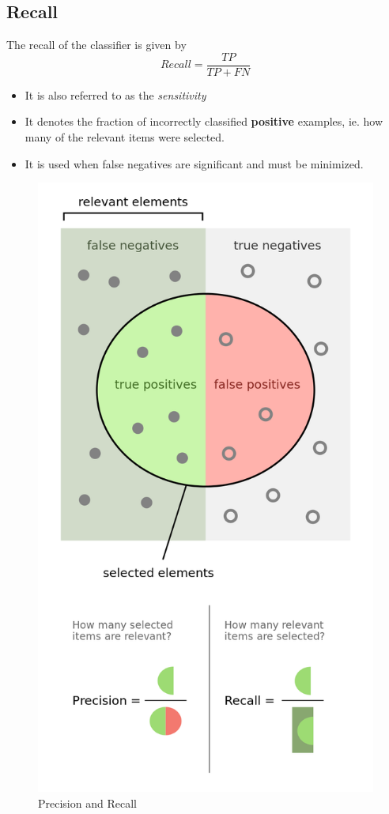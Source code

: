 \documentclass{article}
\theoremstyle{plain}
\theoremstyle{definition}
\begin{document}
\subsection{Recall}
The recall of the classifier is given by
\begin{equation}
    Recall = \frac{TP}{TP+FN}
\end{equation}
\begin{itemize}
    \item It is also referred to as the \textit{sensitivity}
    
    \item It denotes the fraction of incorrectly classified \textbf{positive} examples, ie. how many of the relevant items were selected. 
    
    \item It is used when false negatives are significant and must be minimized.
\end{itemize}
\begin{figure}[!ht]
    \centering
    \includegraphics[scale=0.2]{prec_recl.png}
    \caption{Precision and Recall}
    \label{fig:my_label_6}
\end{figure}
\end{document}
